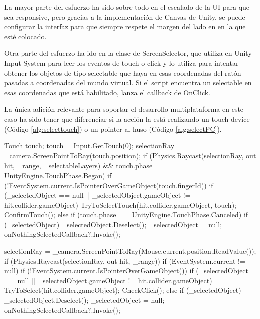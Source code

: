 La mayor parte del esfuerzo ha sido sobre todo en el escalado de la UI para que sea responsive, pero gracias a la implementación de Canvas\cite{unitycanvas} de Unity, se puede configurar la interfaz para que siempre respete el margen del lado en en la que esté colocado.

Otra parte del esfuerzo ha ido en la clase de ScreenSelector, que utiliza en Unity Input System\cite{unityinputsystem} para leer los eventos de touch o click y lo utiliza para intentar obtener los objetos de tipo selectable que haya en esas coordenadas del ratón pasadas a coordenadas del mundo virtual. Si el script encuentra un selectable en esas coordenadas que está habilitado, lanza el callback de OnClick.

La única adición relevante para soportar el desarrollo multiplataforma en este caso ha sido tener que diferenciar si la acción la está realizando un touch device (Código \ref{alg:selecttouch}) o un pointer al huso (Código \ref{alg:selectPC}).

\begin{mypython}[caption={Código para seleccionar una entidad en un 'Touch Device'.},label={alg:selecttouch}]
Touch touch;
touch = Input.GetTouch(0);
selectionRay = _camera.ScreenPointToRay(touch.position);
if (Physics.Raycast(selectionRay, out hit, _range, _selectableLayers) && touch.phase == UnityEngine.TouchPhase.Began)
{
    if (!EventSystem.current.IsPointerOverGameObject(touch.fingerId))
    {
        if (_selectedObject == null || _selectedObject.gameObject != hit.collider.gameObject)
        {
            TryToSelectTouch(hit.collider.gameObject, touch);
        }
        ConfirmTouch();
    }
}
else if (touch.phase == UnityEngine.TouchPhase.Canceled)
{
    if (_selectedObject)
    {
        _selectedObject.Deselect();
        _selectedObject = null;
        onNothingSelectedCallback?.Invoke();
    }
}
\end{mypython}

\begin{mypython}[caption={Código para seleccionar una entidad en PC.},label={alg:selectPC}]
selectionRay = _camera.ScreenPointToRay(Mouse.current.position.ReadValue());
if (Physics.Raycast(selectionRay, out hit, _range))
{
    if (EventSystem.current != null)
    {
        if (!EventSystem.current.IsPointerOverGameObject())
        {
            if (_selectedObject == null || _selectedObject.gameObject != hit.collider.gameObject)
            {
                TryToSelect(hit.collider.gameObject);
            }
            CheckClick();
        }
    }
}
else
{
    if (_selectedObject)
    {
        _selectedObject.Deselect();
        _selectedObject = null;
        onNothingSelectedCallback?.Invoke();
    }
}
\end{mypython}

